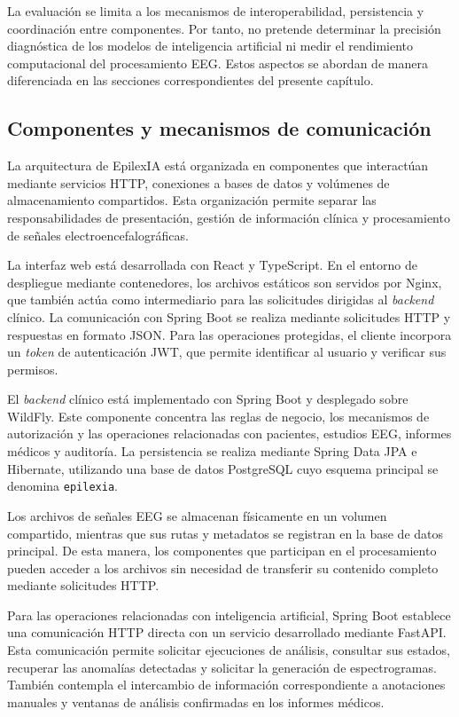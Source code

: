 La evaluación se limita a los mecanismos de interoperabilidad, persistencia y coordinación entre componentes. Por tanto, no pretende determinar la precisión diagnóstica de los modelos de inteligencia artificial ni medir el rendimiento computacional del procesamiento EEG. Estos aspectos se abordan de manera diferenciada en las secciones correspondientes del presente capítulo.


\subsection{Componentes y mecanismos de comunicación}

\label{subsec:componentes_integracion}

La arquitectura de EpilexIA está organizada en componentes que interactúan mediante servicios HTTP, conexiones a bases de datos y volúmenes de almacenamiento compartidos. Esta organización permite separar las responsabilidades de presentación, gestión de información clínica y procesamiento de señales electroencefalográficas.


La interfaz web está desarrollada con React y TypeScript. En el entorno de despliegue mediante contenedores, los archivos estáticos son servidos por Nginx, que también actúa como intermediario para las solicitudes dirigidas al \textit{backend} clínico. La comunicación con Spring Boot se realiza mediante solicitudes HTTP y respuestas en formato JSON. Para las operaciones protegidas, el cliente incorpora un \textit{token} de autenticación JWT, que permite identificar al usuario y verificar sus permisos.


El \textit{backend} clínico está implementado con Spring Boot y desplegado sobre WildFly. Este componente concentra las reglas de negocio, los mecanismos de autorización y las operaciones relacionadas con pacientes, estudios EEG, informes médicos y auditoría. La persistencia se realiza mediante Spring Data JPA e Hibernate, utilizando una base de datos PostgreSQL cuyo esquema principal se denomina \texttt{epilexia}.

Los archivos de señales EEG se almacenan físicamente en un volumen compartido, mientras que sus rutas y metadatos se registran en la base de datos principal. De esta manera, los componentes que participan en el procesamiento pueden acceder a los archivos sin necesidad de transferir su contenido completo mediante solicitudes HTTP.

Para las operaciones relacionadas con inteligencia artificial, Spring Boot establece una comunicación HTTP directa con un servicio desarrollado mediante FastAPI. Esta comunicación permite solicitar ejecuciones de análisis, consultar sus estados, recuperar las anomalías detectadas y solicitar la generación de espectrogramas. También contempla el intercambio de información correspondiente a anotaciones manuales y ventanas de análisis confirmadas en los informes médicos.

